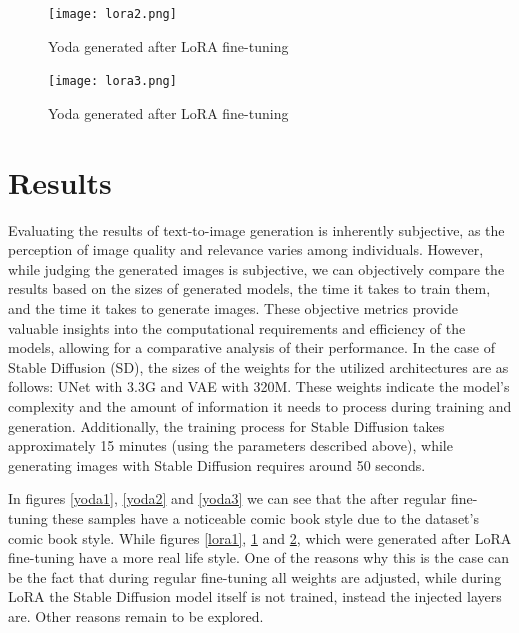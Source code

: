 \documentclass[conference]{IEEEtran}
\begin{document}
\begin{figure}
\centerline{\texttt{[image: lora2.png]}}
\caption{Yoda generated after LoRA fine-tuning}
\label{lora2}
\end{figure}

\begin{figure}
\centerline{\texttt{[image: lora3.png]}}
\caption{Yoda generated after LoRA fine-tuning}
\label{lora3}
\end{figure}


\section{Results}
Evaluating the results of text-to-image generation is inherently subjective, as the perception of image quality and relevance varies among individuals. However, while judging the generated images is subjective, we can objectively compare the results based on the sizes of generated models, the time it takes to train them, and the time it takes to generate images. These objective metrics provide valuable insights into the computational requirements and efficiency of the models, allowing for a comparative analysis of their performance.
In the case of Stable Diffusion (SD), the sizes of the weights for the utilized architectures are as follows: UNet with 3.3G and VAE with 320M. These weights indicate the model's complexity and the amount of information it needs to process during training and generation. Additionally, the training process for Stable Diffusion takes approximately 15 minutes (using the parameters described above), while generating images with Stable Diffusion requires around 50 seconds.

In figures \ref{yoda1}, \ref{yoda2} and \ref{yoda3} we can see that the after regular fine-tuning these samples have a noticeable comic book style due to the dataset's comic book style. While figures \ref{lora1}, \ref{lora2} and \ref{lora3}, which were generated after LoRA fine-tuning have a more real life style. One of the reasons why this is the case can be the fact that during regular fine-tuning all weights are adjusted, while during LoRA the Stable Diffusion model itself is not trained, instead the injected layers are. Other reasons remain to be explored.
\end{document}
